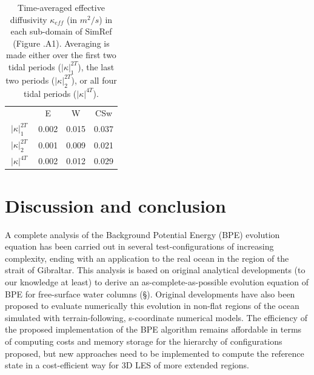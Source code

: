 \begin{table}[h]
    \centering
    \begin{tabular}{|c|c|c|c|}
          \hline
         & E & W & CSw \\
         \cline{2-4}
         $\: |\kappa|^{2T}_1\;$ & 0.002 & 0.015 & 0.037\\
         $\: |\kappa|^{2T}_2 \;$ & 0.001 & 0.009 & 0.021\\
         $\: |\kappa|^{4T} \;$ & 0.002 & 0.012 & 0.029\\
         \hline
    \end{tabular}
    \caption[Time-averaged effective diffusivity $\kappa_{eff}$ in SimRef.]{Time-averaged effective diffusivity $\kappa_{eff}$ (in $m^2/s$) in each sub-domain of SimRef (Figure .A1). Averaging is made either over the first two tidal periods ($|\kappa |^{2T}_1$), the last two periods ($|\kappa |^{2T}_2$), or all four tidal periods ($|\kappa |^{4T}$).}
    \label{tab_kappaTCS}
\end{table}

\section{Discussion and conclusion}
A complete analysis of the Background Potential Energy (BPE) evolution equation has been carried out in several test-configurations of increasing complexity, ending with an application to the real ocean in the region of the strait of Gibraltar. This analysis is based on original analytical developments (to our knowledge at least) to derive an as-complete-as-possible evolution equation of BPE for free-surface water columns (\S {}). Original developments have also been proposed to evaluate numerically this evolution in non-flat regions of the ocean simulated with terrain-following, s-coordinate numerical models. The efficiency of the proposed implementation of the BPE algorithm remains affordable in terms of computing costs and memory storage for the hierarchy of configurations proposed, but new approaches need to be implemented to compute the reference state in a cost-efficient way \citep{saenz_estimating_2015} for 3D LES of more extended regions.

